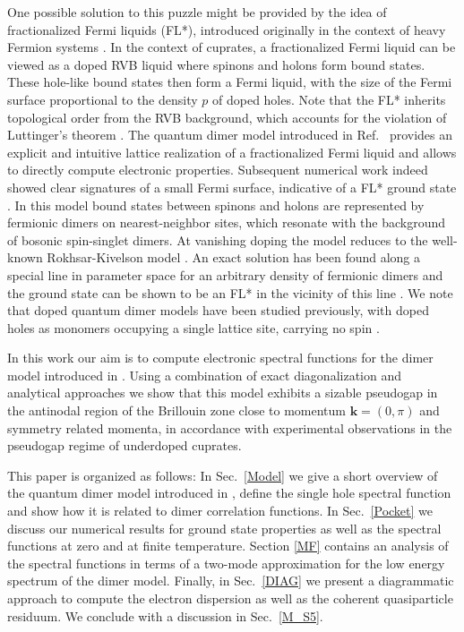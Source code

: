 \documentclass[aps,pra,reprint,showpacs,superscriptaddress]{revtex4-1}
\begin{document}
One possible solution to this puzzle might be provided by the idea of fractionalized Fermi liquids (FL*), introduced originally in the context of heavy Fermion systems \cite{senthil2003fractionalized}. In the context of cuprates, a fractionalized Fermi liquid can be viewed as a doped RVB liquid where spinons and holons form bound states. These hole-like bound states then form a Fermi liquid, with the size of the Fermi surface proportional to the density $p$ of doped holes. Note that the FL* inherits topological order from the RVB background,
which accounts for the violation of Luttinger's theorem \cite{senthil2004weak,kaul2007algebraic,qi2010effective,mei2012luttinger,punk2012fermi,sachdev2016novel}.
The quantum dimer model introduced in Ref.~\cite{punk2015quantum} provides an explicit and intuitive lattice realization of a fractionalized Fermi liquid and allows to directly compute electronic properties. Subsequent numerical work indeed showed clear signatures of a small Fermi surface, indicative of a FL* ground state \cite{lee2016electronic}. In this model bound states between spinons and holons are represented by fermionic dimers on nearest-neighbor sites, which resonate with the background of bosonic spin-singlet dimers. At vanishing doping the model reduces to the well-known Rokhsar-Kivelson model \cite{rokhsar1988superconductivity}. An exact solution has been found along a special line in parameter space for an arbitrary density of fermionic dimers and the ground state can be shown to be an FL* in the vicinity of this line \cite{feldmeier2017exact}. We note that doped quantum dimer models have been studied previously, with doped holes as monomers occupying a single lattice site, carrying no spin \cite{rokhsar1988superconductivity,poilblanc2008properties,lamas2012statistical}. 

In this work our aim is to compute electronic spectral functions for the dimer model introduced in \cite{punk2015quantum}. Using a combination of exact diagonalization and analytical approaches we show that this model exhibits a sizable pseudogap in the antinodal region of the Brillouin zone close to momentum $\mathbf{k}=(0,\pi)$ and symmetry related momenta, in accordance with experimental observations in the pseudogap regime of underdoped cuprates. 



This paper is organized as follows: In Sec.~\ref{Model} we give a short overview of the quantum dimer model introduced in \cite{punk2015quantum}, define the single hole spectral function and show how it is related to dimer correlation functions. In Sec.~\ref{Pocket} we discuss our numerical results for ground state properties as well as the spectral functions at zero and at finite temperature. Section \ref{MF} contains an analysis of the spectral functions in terms of a two-mode approximation for the low energy spectrum of the dimer model. Finally, in Sec.~\ref{DIAG} we present a diagrammatic approach to compute the electron dispersion as well as the coherent quasiparticle residuum. We conclude with a discussion in Sec.~\ref{M_S5}.
\end{document}
